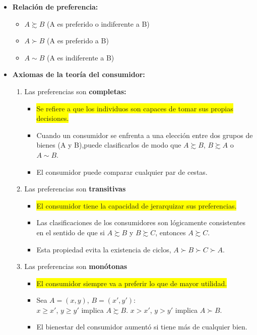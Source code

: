 \documentclass{templateNote}
\newcommand{\destacar}[1]{ \colorbox{yellow}{#1}}
\begin{document}
\begin{itemize}
    \item \textbf{Relación de preferencia:}
    \begin{itemize}
        \item $A \succsim B$ (A es preferido o indiferente a B)
        \item $A \succ B$ (A es preferido a B)
        \item $A \sim B$ (A es indiferente a B)
    \end{itemize}

    \item \textbf{Axiomas de la teoría del consumidor:}
    \begin{enumerate}
        \item Las preferencias son \textbf{completas:}
        \begin{itemize}
            \item \destacar{Se refiere a que los individuos son capaces de tomar sus propias decisiones.}
            \item Cuando un consumidor se enfrenta a una elección entre dos grupos de
            bienes (A y B),puede clasificarlos de modo que $A \succsim B$, $B \succsim A$ o $A \sim B$.
            \item El consumidor puede comparar cualquier par de cestas.
        \end{itemize}

        \item Las preferencias son \textbf{transitivas}
        \begin{itemize}
            \item \destacar{El consumidor tiene la capacidad de jerarquizar sus preferencias.}
            \item Las clasificaciones de los consumidores son lógicamente consistentes en
            el sentido de que si $A \succsim B$ y $B \succsim C$, entonces $A \succsim C$.
            \item Esta propiedad evita la existencia de ciclos, $A \succ B \succ C \succ A$.
        \end{itemize}
        \item Las preferencias son \textbf{monótonas}
        \begin{itemize}
            \item \destacar{El consumidor siempre va a preferir lo que de mayor utilidad.}
            \item Sea $A = (x,y)$, $B = (x',y')$: \\
            $x \geq  x'$, $y \geq y'$ implica $A \succsim B$.
            $x >  x'$, $y > y'$ implica $A \succ B$.
            \item El bienestar del consumidor aumentó si tiene más de cualquier bien.
        \end{itemize}


\end{enumerate}
\end{itemize}
\end{document}
